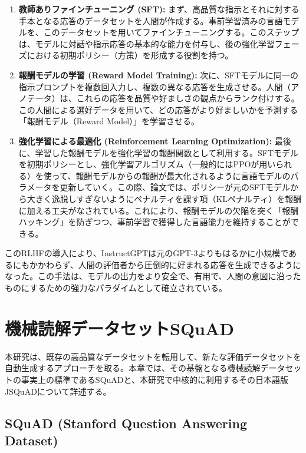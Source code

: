 \documentclass[a4paper,11pt]{jreport}
\begin{document}
\begin{enumerate}
    \item \textbf{教師ありファインチューニング (SFT):}
    まず、高品質な指示とそれに対する手本となる応答のデータセットを人間が作成する。事前学習済みの言語モデルを、このデータセットを用いてファインチューニングする。このステップは、モデルに対話や指示応答の基本的な能力を付与し、後の強化学習フェーズにおける初期ポリシー（方策）を形成する役割を持つ。

    \item \textbf{報酬モデルの学習 (Reward Model Training):}
    次に、SFTモデルに同一の指示プロンプトを複数回入力し、複数の異なる応答を生成させる。人間（アノテータ）は、これらの応答を品質や好ましさの観点からランク付けする。この人間による選好データを用いて、どの応答がより好ましいかを予測する「報酬モデル（Reward Model）」を学習させる。

    \item \textbf{強化学習による最適化 (Reinforcement Learning Optimization):}
    最後に、学習した報酬モデルを強化学習の報酬関数として利用する。SFTモデルを初期ポリシーとし、強化学習アルゴリズム（一般的にはPPOが用いられる）を使って、報酬モデルからの報酬が最大化されるように言語モデルのパラメータを更新していく。この際、論文では、ポリシーが元のSFTモデルから大きく逸脱しすぎないようにペナルティを課す項（KLペナルティ）を報酬に加える工夫がなされている\cite{InstructGPT}。これにより、報酬モデルの欠陥を突く「報酬ハッキング」を防ぎつつ、事前学習で獲得した言語能力を維持することができる。
\end{enumerate}
このRLHFの導入により、InstructGPTは元のGPT-3よりもはるかに小規模であるにもかかわらず、人間の評価者から圧倒的に好まれる応答を生成できるようになった\cite{InstructGPT}。この手法は、モデルの出力をより安全で、有用で、人間の意図に沿ったものにするための強力なパラダイムとして確立されている。






\chapter{機械読解データセットSQuAD}
\label{chap:squad_datasets}

本研究は、既存の高品質なデータセットを転用して、新たな評価データセットを自動生成するアプローチを取る。本章では、その基盤となる機械読解データセットの事実上の標準であるSQuADと、本研究で中核的に利用するその日本語版JSQuADについて詳述する。



\section{SQuAD (Stanford Question Answering Dataset)}
\label{sec:squad}
\end{document}
